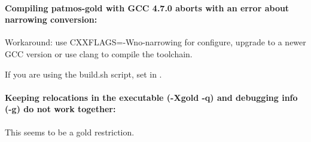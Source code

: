 \paragraph{Compiling patmos-gold with GCC 4.7.0 aborts with an error about narrowing conversion:}
Workaround: use CXXFLAGS=-Wno-narrowing for configure, upgrade to a newer GCC version or
use clang to compile the toolchain.

If you are using the build.sh script, set  in .


\paragraph{Keeping relocations in the executable (-Xgold -q) and debugging info (-g) do not work together:}
This seems to be a gold restriction.



